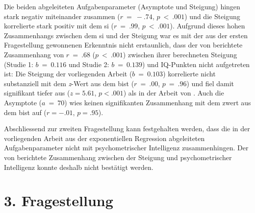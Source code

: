 \documentclass[11pt, twoside, a4paper]{book}		%
\begin{document}
Die beiden abgeleiteten Aufgabenparameter (Asymptote und Steigung) hingen stark negativ miteinander zusammen ($r~=~-.74$, $p~<~.001$) und die Steigung korrelierte stark positiv mit dem \gls{si} ($r~=~.99$, $p~<~.001$). 
Aufgrund dieses hohen Zusammenhangs zwischen dem \gls{si} und der Steigung  war es mit der aus der ersten Fragestellung gewonnenen Erkenntnis nicht erstaunlich, dass der von \citet{Melnick2013} berichtete Zusammenhang von $r~=~.68$ ($p~<~.001$) zwischen ihrer berechneten Steigung (Studie 1: $b~=~0.116$ und Studie 2: $b~=~0.139$) und IQ-Punkten nicht aufgetreten ist: Die Steigung der vorliegenden Arbeit ($b~=~0.103$) korrelierte nicht substanziell mit dem \textit{z}-Wert aus dem \gls{bist} ($r~=~.00$, $p~=~.96$) und fiel damit signifikant tiefer aus ($z=5.61$, $p<.001$) als in der Arbeit von \citeauthor{Melnick2013}.
Auch die Asymptote ($a~=~70$) wies keinen signifikanten Zusammenhang mit dem \gls{zwert} aus dem \gls{bist} auf ($r=-.01$, $p=.95$).

Abschliessend zur zweiten Fragestellung kann festgehalten werden, dass die in der vorliegenden Arbeit aus der exponentiellen Regression abgeleiteten Aufgabenparameter nicht mit psychometrischer Intelligenz zusammenhingen. Der von \citet{Melnick2013} berichtete Zusammenhang zwischen der Steigung und psychometrischer Intelligenz konnte deshalb nicht bestätigt werden.











\section{3. Fragestellung \label{sec:3Fragestellung}}
\end{document}
